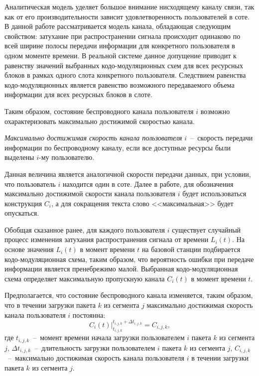 Аналитическая модель уделяет большое внимание нисходящему каналу связи, так как от его производительности зависит удовлетворенность пользователей в соте. В данной работе рассматривается модель канала, обладающая следующим свойством: затухание при распространении сигнала происходит одинаково по всей ширине полосы передачи информации для конкретного пользователя в одном моменте времени. В реальной системе данное допущение приводит к равенству значений выбранных кодо-модуляционных схем для всех ресурсных блоков в рамках одного слота конкретного пользователя. Следствием равенства кодо-модуляционных является равенство возможного передаваемого объема информации для всех ресурсных блоков в слоте.

Таким образом, состояние беспроводного канала пользователя $i$ возможно охарактеризовать максимально достижимой скоростью канала.
\begin{definition}
\label{def:MaxThroughput}
    \emph{Максимально достижимая скорость канала пользователя $i$}~--~скорость передачи информации по беспроводному каналу, если все доступные ресурсы были выделены $i$-му пользователю.
\end{definition}
Данная величина является аналогичной скорости передачи данных, при условии, что пользователь $i$ находится один в соте. Далее в работе, для обозначения максимально достижимой скорости канала пользователя $i$ будет использоваться конструкция $C_i$, а для сокращения текста слово <<максимальная>> будет опускаться.

Обобщая сказанное ранее, для каждого пользователя $i$ существует случайный процесс изменения затухания распространения сигнала от времени $L_i(t)$. На основе значения $L_i(t)$ в момент времени $t$ на базовой станции подбирается кодо-модуляционная схема, таким образом, что вероятность ошибки при передаче информации является пренебрежимо малой. Выбранная кодо-модуляционная схема определяет максимальную пропускную канала $C_i(t)$ в момент времени $t$.

Предполагается, что состояние беспроводного канала изменяется, таким образом, что в течении загрузки пакета $k$ из сегмента $j$ максимально достижимая скорость канала пользователя $i$ постоянна:
\begin{equation}
\left.C_i(t)\right\vert^{t_{i,j,k}+\Delta t_{i,j,k}}_{t_{i,j,k}}=C_{i,j,k},
\label{eq:ChannelConst}
\end{equation}
где $t_{i,j,k}$~--~момент времени начала загрузки пользователем $i$ пакета $k$ из сегмента $j$, $\Delta t_{i,j,k}$~--~длительность загрузки пользователем $i$ пакета $k$ из сегмента $j$, $C_{i,j,k}$~--~максимально достижимая скорость канала пользователя $i$ в течении загрузки пакета $k$ из сегмента $j$.

